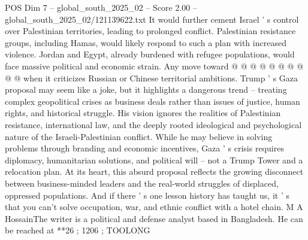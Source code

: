 \begin{textsample}{POS Dim 7 – global\_south\_2025\_02 – Score 2.00 – global\_south\_2025\_02/121139622.txt}
It would further cement Israel ' s control over Palestinian territories, leading to prolonged conflict.
Palestinian resistance groups, including Hamas, would likely respond to such a plan with increased violence.
Jordan and Egypt, already burdened with refugee populations, would face massive political and economic strain.
Any move toward @ @ @ @ @ @ @ @ @ @ when it criticizes Russian or Chinese territorial ambitions.
Trump ' s Gaza proposal may seem like a joke, but it highlights a dangerous trend -- treating complex geopolitical crises as business deals rather than issues of justice, human rights, and historical struggle.
His vision ignores the realities of Palestinian resistance, international law, and the deeply rooted ideological and psychological nature of the Israeli-Palestinian conflict.
While he may believe in solving problems through branding and economic incentives, Gaza ' s crisis requires diplomacy, humanitarian solutions, and political will -- not a Trump Tower and a relocation plan.
At its heart, this absurd proposal reflects the growing disconnect between business-minded leaders and the real-world struggles of displaced, oppressed populations.
And if there ' s one lesson history has taught us, it ' s that you can't solve occupation, war, and ethnic conflict with a hotel chain.
M A HossainThe writer is a political and defense analyst based in Bangladesh.
He can be reached at **26 ; 1206 ; TOOLONG

\end{textsample}
